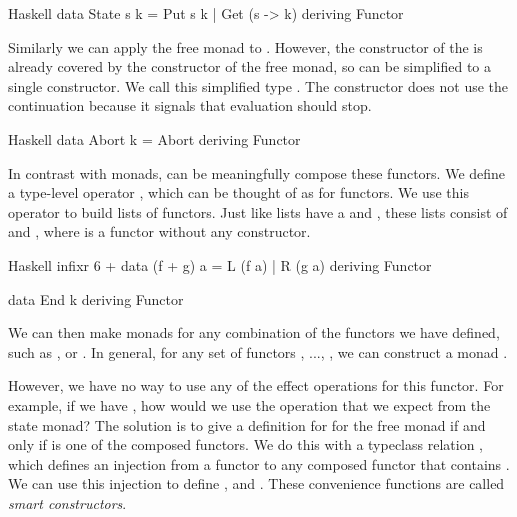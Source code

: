 \begin{lst}{Haskell}
data State s k = Put s k | Get (s -> k)
  deriving Functor
\end{lst}

Similarly we can apply the free monad to . However, the  constructor of the  is already covered by the  constructor of the free monad, so  can be simplified to a single constructor. We call this simplified type . The  constructor does not use the continuation because it signals that evaluation should stop.

\begin{lst}{Haskell}
data Abort k = Abort
  deriving Functor
\end{lst}

In contrast with monads, can be meaningfully compose these functors. We define a type-level operator \hs{+}, which can be thought of as  for functors. We use this operator to build lists of functors. Just like lists have a  and , these lists consist of \hs{+} and , where  is a functor without any constructor.

\begin{lst}{Haskell}
infixr 6 +
data (f + g) a = L (f a) | R (g a)
  deriving Functor

data End k
  deriving Functor
\end{lst}

We can then make monads for any combination of the functors we have defined, such as ,  or . In general, for any set of functors , ..., , we can construct a monad .

However, we have no way to use any of the effect operations for this functor. For example, if we have , how would we use the  operation that we expect from the state monad? The solution is to give a definition for  for the free monad if and only if  is one of the composed functors. We do this with a typeclass relation \hs{<}, which defines an injection from a functor  to any composed functor  that contains . We can use this injection to define ,  and . These convenience functions are called \emph{smart constructors}.


